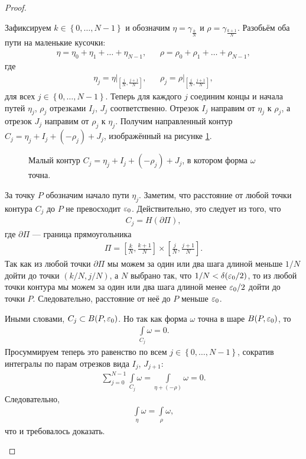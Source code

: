 \begin{proof}
\begin{itemize}
   Зафиксируем $k \in \left\{ 0, \ldots, N-1 \right\}$ и обозначим $\eta = \gamma_{\frac{k}{N}}$  и $\rho = \gamma_{\frac{k+1}{N}}$. Разобьём оба пути на маленькие кусочки:
   \begin{align*}
    \eta = \eta_0 + \eta_1 + \ldots + \eta_{N-1}, & &\rho = \rho_0 + \rho_1 + \ldots + \rho_{N-1},
   \end{align*} где
   \begin{align*}
    \eta_j = \eta \rvert_{\left[\frac{j}{N},\frac{j+1}{N}\right]  }, & &\rho_j = \rho \rvert_{\left[\frac{j}{N},\frac{j+1}{N}\right]  },
   \end{align*} для всех $j \in \left\{ 0, \ldots, N - 1 \right\}$. Теперь для каждого $j$ соединим концы и начала путей $\eta_j$, $\rho_j$ отрезками $I_j$, $J_j$ соответственно. Отрезок $I_j$ направим от $\eta_j$ к $\rho_j$, а отрезок $J_j$ направим от $\rho_j$ к $\eta_j$. Получим направленный контур $C_j = \eta_j + I_j + (-\rho_j) + J_j$, изображённый на рисунке \ref{fig:closed_1_form_small_contur}.

   \begin{figure}[ht]
    \centering
    \caption{Малый контур $C_j = \eta_j + I_j + (-\rho_j) + J_j$, в котором форма $\omega$ точна.}
    \label{fig:closed_1_form_small_contur}
   \end{figure}

   За точку $P$ обозначим начало пути $\eta_j$. Заметим, что расстояние от любой точки контура $C_j$ до $P$ не превосходит $\varepsilon_0$. Действительно, это следует из того, что
   \begin{align*}
    C_j = H(\partial \Pi),
   \end{align*} где $\partial \Pi$ --- граница прямоугольника
   \begin{align*}
    \Pi = \left[ \frac{k}{N}, \frac{k+1}{N} \right] \times \left[ \frac{j}{N}, \frac{j+1}{N} \right].
   \end{align*} Так как из любой точки $\partial \Pi$ мы можем за один или два шага длиной меньше $1 / N$ дойти до точки $(k / N, j / N)$, а $N$ выбрано так, что $1 / N < \delta(\varepsilon_0 / 2)$, то из любой точки контура мы можем за один или два шага длиной менее $\varepsilon_0 / 2$ дойти до точки $P$. Следовательно, расстояние от неё до $P$ меньше $\varepsilon_0$.

   Иными словами, $C_j \subset B(P,\varepsilon_0)$. Но так как форма $\omega$ точна в шаре $B(P,\varepsilon_0)$, то
   \begin{align*}
    \int\limits_{C_j} \omega = 0.
   \end{align*} Просуммируем теперь это равенство по всем $j \in \left\{ 0, \ldots,N-1 \right\}$, сократив интегралы по парам отрезков вида $I_j$, $J_{j+1}$:
   \begin{align*}
    \sum_{j=0}^{N-1} \int\limits_{C_j} \omega = \int\limits_{\eta + (- \rho)}  \omega = 0.
   \end{align*} Следовательно,
   \begin{align*}
    \int\limits_{\eta} \omega = \int\limits_{\rho} \omega,  
   \end{align*} что и требовалось доказать.


\end{itemize}
\end{proof}
